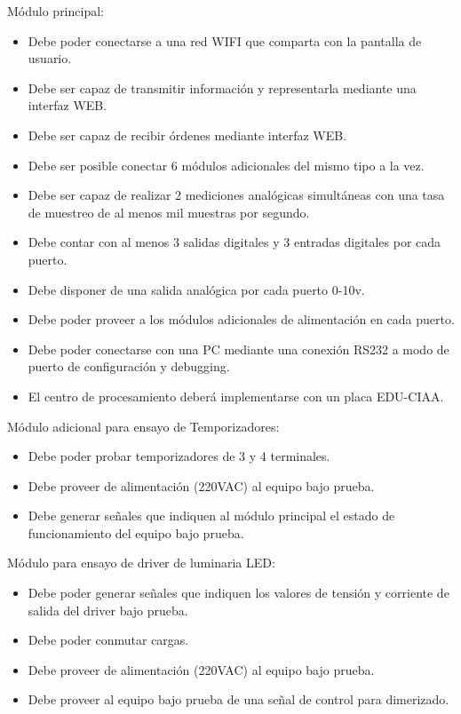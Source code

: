 Módulo principal:

\begin{itemize}
	\item Debe poder conectarse a una red WIFI que comparta con la pantalla de usuario.
	\item Debe ser capaz de transmitir información y representarla mediante una interfaz WEB.
	\item Debe ser capaz de recibir órdenes mediante interfaz WEB.
	\item Debe ser posible conectar 6 módulos adicionales del mismo tipo a la vez.
	\item Debe ser capaz de realizar 2 mediciones analógicas simultáneas con una tasa de 	muestreo de al menos mil muestras por segundo.
	\item Debe contar con al menos 3 salidas digitales y 3 entradas digitales por cada puerto. 
	\item Debe disponer de una salida analógica por cada puerto 0-10v.	
	\item Debe poder proveer a los módulos adicionales de alimentación en cada puerto.
	\item Debe poder conectarse con una PC mediante una conexión RS232 a modo de 		puerto de configuración y debugging.
	\item El centro de procesamiento deberá implementarse con un placa EDU-CIAA.
	
\end{itemize}

Módulo adicional para ensayo de Temporizadores:

\begin{itemize}
	\item Debe poder probar temporizadores de 3 y 4 terminales.
	\item Debe proveer de alimentación (220VAC) al equipo bajo prueba.
	\item Debe generar señales que indiquen al módulo principal el estado de funcionamiento del equipo bajo prueba. 
	
\end{itemize}

Módulo para ensayo de driver de luminaria LED:

\begin{itemize}
	\item Debe poder generar señales que indiquen los valores de tensión y corriente de salida del driver bajo prueba.
	\item Debe poder conmutar cargas.
	\item Debe proveer de alimentación (220VAC) al equipo bajo prueba.
	\item Debe proveer al equipo bajo prueba de una señal de control para dimerizado.
\end{itemize}

